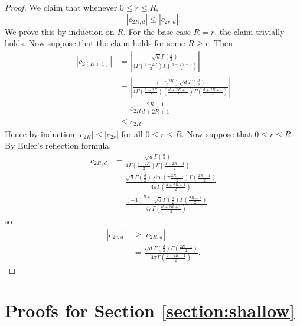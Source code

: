 \documentclass{article}
\theoremstyle{definition}
\begin{document}
\begin{proof}
    We claim that whenever $0 \leq r \leq R$,
    \[|c_{2R, d}| \leq |c_{2r, d}|. \]
    We prove this by induction on $R$. For the base case $R = r$, the claim trivially holds. Now suppose that the claim holds for some $R \geq r$. Then
    \begin{align*}
        |c_{2(R + 1)}| &= \left|\frac{\sqrt{d}\Gamma\left(\frac{d}{2} \right) }{4\Gamma\left(\frac{1 - 2R}{2} \right)\Gamma\left(\frac{d + 2R + 3}{2}\right)  }  \right|\\
        &= \left|\frac{\left(\frac{1 - 2R }{2}\right)\sqrt{d}\Gamma\left(\frac{d}{2}\right)}{4 \Gamma\left(\frac{1 - 2R}{2}\right)\left(\frac{d + 2R + 1}{2}\right)\Gamma\left(\frac{d + 2R + 1}{2}\right) }\right|\\
        &= c_{2R} \frac{|2R - 1|}{d + 2R + 1}\\
        &\leq c_{2R}.
    \end{align*}
    Hence by induction $|c_{2R}| \leq |c_{2r}|$ for all $0 \leq r \leq R$. Now suppose that $0 \leq r \leq R$. By Euler's reflection formula,
    \begin{align*}
        c_{2R, d} &= \frac{\sqrt{d}\Gamma\left(\frac{d}{2}\right) }{4\Gamma\left(\frac{3 - 2R}{2}\right)\Gamma\left(\frac{d + 2R + 1}{2}\right) }\\
        &= \frac{\sqrt{d} \Gamma\left(\frac{d}{2}\right)\sin\left(\pi \frac{2R - 1}{2} \right)\Gamma\left(\frac{2R - 1}{2}\right) }{4\pi \Gamma\left(\frac{d + 2R + 1}{2} \right) }\\
        &= \frac{(-1)^{R + 1} \sqrt{d}\Gamma\left(\frac{d}{2}\right)\Gamma\left(\frac{2R - 1}{2}\right) }{4\pi \Gamma\left(\frac{d + 2R + 1}{2}\right) }
    \end{align*}
    so
    \begin{align*}
        |c_{2r, d}| &\geq |c_{2R, d}|\\
        &= \frac{\sqrt{d}\Gamma\left(\frac{d}{2}\right) \Gamma\left(\frac{2R - 1}{2}\right) }{4\pi \Gamma\left(\frac{d + 2R + 1}{2}\right) }.
    \end{align*}
\end{proof}


\section{Proofs for Section \ref{section:shallow}}
\end{document}
